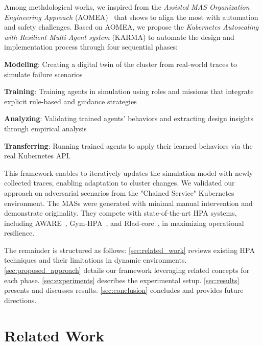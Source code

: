 \documentclass[conference]{IEEEtran}
\begin{document}
Among methdological works, we inspired from the \textit{Assisted MAS Organization Engineering Approach} (AOMEA)~\cite{soule2024aomea} that shows to align the most with automation and safety challenges. Based on AOMEA, we propose the \textit{Kubernetes Autoscaling with Resilient Multi-Agent system} (KARMA) to automate the design and implementation process through four sequential phases:
\begin{enumerate*}[label=\textbf{\arabic*)}, itemjoin={;\quad }]
    \item \textbf{Modeling}: Creating a digital twin of the cluster from real-world traces to simulate failure scenarios
    \item \textbf{Training}: Training agents in simulation using roles and missions that integrate explicit rule-based and guidance strategies
    \item \textbf{Analyzing}: Validating trained agents' behaviors and extracting design insights through empirical analysis
    \item \textbf{Transferring}: Running trained agents to apply their learned behaviors via the real Kubernetes API.
\end{enumerate*}

This framework enables to iteratively updates the simulation model with newly collected traces, enabling adaptation to cluster changes. We validated our approach on adversarial scenarios from the "Chained Service" Kubernetes environment. The MASs were generated with minimal manual intervention and demonstrate originality. They compete with state-of-the-art HPA systems, including AWARE~\cite{aware2023}, Gym-HPA~\cite{gymhpa2022}, and Rlad-core~\cite{Rossi2019}, in maximizing operational resilience.

The remainder is structured as follows:
\autoref{sec:related_work} reviews existing HPA techniques and their limitations in dynamic environments.
\autoref{sec:proposed_approach} details our framework leveraging related concepts for each phase.
\autoref{sec:experiments} describes the experimental setup.
\autoref{sec:results} presents and discusses results.
\autoref{sec:conclusion} concludes and provides future directions.


\section{Related Work}
\label{sec:related_work}
\end{document}
